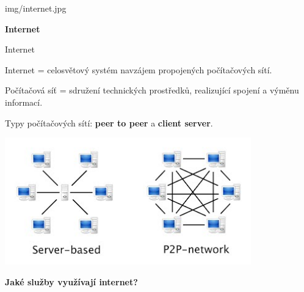 \documentclass[aspectratio=169]{beamer}
\begin{document}
\begin{frameImg}[width]{img/internet.jpg}
    \vspace*{60mm}
    \begin{cardTiny}
        \vspace*{\fill}
        \begin{center}
            \textbf{Internet}
        \end{center}
    \end{cardTiny}
\end{frameImg}

\begin{frame}{Internet}
    \begin{cardTiny}
        \begin{flushleft}
            Internet = celosvětový systém navzájem propojených počítačových sítí.

            
            \vspace{2ex}
            Počítačová síť = sdružení technických prostředků, realizující spojení a výměnu informací.

            
            \vspace{2ex}
            Typy počítačových sítí: \textbf{peer to peer} a \textbf{client server}.
        \end{flushleft}
    \end{cardTiny}
\end{frame}


\begin{frame}
    \begin{center}    
        \includegraphics[width=0.8\textwidth]{img/p2pcs.jpg}
    \end{center}

    \begin{cardTiny}
        \begin{center}
            \textbf{Jaké služby využívají internet?}
        \end{center}
    \end{cardTiny}
\end{frame}
\end{document}
